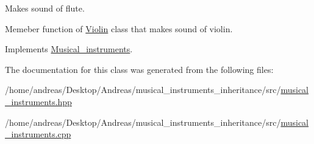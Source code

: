 Makes sound of flute. 

Memeber function of \hyperlink{classViolin}{Violin} class that makes sound of violin. 

Implements \hyperlink{classMusical__instruments_ace676c6043eb1335023c02cd547b0ab9}{Musical\+\_\+instruments}.



The documentation for this class was generated from the following files\+:\begin{DoxyCompactItemize}
\item 
/home/andreas/\+Desktop/\+Andreas/musical\+\_\+instruments\+\_\+inheritance/src/\hyperlink{musical__instruments_8hpp}{musical\+\_\+instruments.\+hpp}\item 
/home/andreas/\+Desktop/\+Andreas/musical\+\_\+instruments\+\_\+inheritance/src/\hyperlink{musical__instruments_8cpp}{musical\+\_\+instruments.\+cpp}\end{DoxyCompactItemize}
